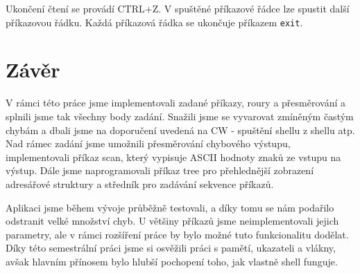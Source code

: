 \documentclass[a4paper]{article}
\begin{document}
Ukončení čtení se provádí CTRL+Z. 
V spuštěné příkazové řádce lze spustit další příkazovou řádku. Každá příkazová řádka se ukončuje příkazem \verb+exit+. 



\section{Závěr}

V rámci této práce jsme implementovali zadané příkazy, roury a přesměrování a splnili jsme tak všechny body zadání. Snažili jsme se vyvarovat zmíněným častým chybám a dbali jsme na doporučení uvedená na CW - spuštění shellu z shellu atp. Nad rámec zadání jsme umožnili přesměrování chybového výstupu,  implementovali příkaz scan, který vypisuje ASCII hodnoty znaků ze vstupu na výstup. Dále jsme naprogramovali příkaz tree pro přehlednější zobrazení adresářové struktury a středník pro zadávání sekvence příkazů.

Aplikaci jsme během vývoje průběžně testovali, a díky tomu se nám podařilo odstranit velké množství chyb. U většiny příkazů jsme neimplementovali jejich parametry, ale v rámci rozšíření práce by bylo možné tuto funkcionalitu dodělat.
Díky této semestrální práci jsme si osvěžili práci s pamětí, ukazateli a vlákny, avšak hlavním přínosem bylo hlubší pochopení toho, jak vlastně shell funguje.
\end{document}

